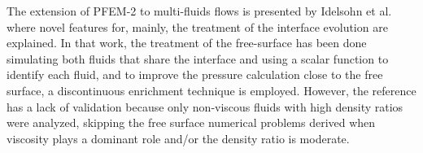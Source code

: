 
The extension of PFEM-2 to multi-fluids flows is presented by Idelsohn et al. \cite{Idelsohn13c} where novel features for, mainly, the treatment of the interface evolution are explained. In that work, the treatment of the free-surface has been done simulating both fluids that share the interface and using a scalar function to identify each fluid, and to improve the pressure calculation close to the free surface, a discontinuous enrichment technique is employed. However, the reference has a lack of validation because only non-viscous fluids with high density ratios were analyzed, skipping the free surface numerical problems derived when viscosity plays a dominant role and/or the density ratio is moderate.

